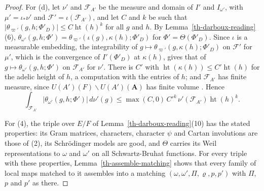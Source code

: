 \begin{proof}
For (d), let $\nu'$ and $\mathcal F_{A'}$ be the measure and domain of $I'$
and $I_{\omega'}$, with $\mu'=\iota_*\nu'$ and $\mathcal F'=\iota(\mathcal
F_{A'})$, and let $C$ and $k$ be such that
$|\theta_{\varpi'}(g,h;\Phi'_D)|\leq C\operatorname{ht}(h)^k$ for all $g$ and
$h$. By Lemma~\ref{th-darboux-reading}(6),
$\theta_{\omega'}(g,h;\Phi')=\theta_{\varpi'}(\iota(g),\kappa(h);\Phi'_D)$ for
$\Phi'=\Theta(\Phi'_D)$. Since $\iota$ is a measurable embedding, the
integrability of $g\mapsto\theta_{\varpi'}(g,\kappa(h);\Phi'_D)$ on
$\mathcal F'$ for $\mu'$, which is the convergence of $I'(\Phi'_D)$ at
$\kappa(h)$, gives that of $g\mapsto\theta_{\omega'}(g,h;\Phi')$ on
$\mathcal F_{A'}$ for $\nu'$. There is $C'$ with
$\operatorname{ht}(\kappa(h))\leq C'\operatorname{ht}(h)$ for the adelic
height of $h$, a computation with the entries of $h$; and $\mathcal F_{A'}$
has finite measure, since $U(A')(F)\backslash U(A')(\mathbf A)$ has finite
volume \cite{BHC62}. Hence
\[
\int_{\mathcal F_{A'}}|\theta_{\omega'}(g,h;\Phi')|\,d\nu'(g)\leq\max(C,0)\,C'^k\,\nu'(\mathcal F_{A'})\operatorname{ht}(h)^k .
\]

For (4), the triple over $E/F$ of Lemma~\ref{th-darboux-reading}(10) has
the stated properties: its Gram matrices, characters, character $\psi$ and
Cartan involutions are those of (2), its Schrödinger models are good, and
$\Theta$ carries its Weil representations to $\omega$ and $\omega'$ on all
Schwartz-Bruhat functions. For every triple with these properties,
Lemma~\ref{th-assemble-matching} shows that every family of local maps matched
to it assembles into a matching $(\omega,\omega',\Pi,\varrho,p,p')$ with
$\Pi$, $p$ and $p'$ as there.
\end{proof}

